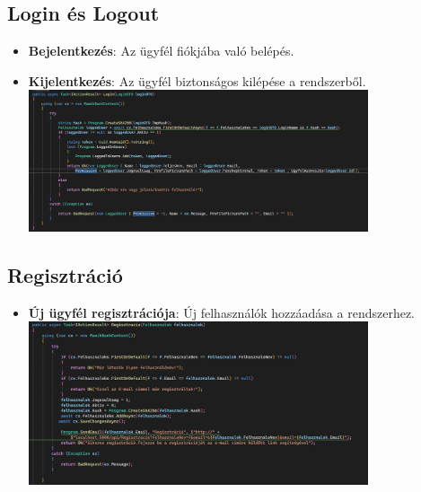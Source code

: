 \documentclass[colorlinks]{thesis-kando}
\theoremstyle{definition}
\theoremstyle{remark}
\begin{document}
\begin{itemize}
\subsection{Login és Logout}
\begin{itemize}
    \item \textbf{Bejelentkezés}: Az ügyfél fiókjába való belépés.
    \item \textbf{Kijelentkezés}: Az ügyfél biztonságos kilépése a rendszerből.
    \\
    \includegraphics[width=10cm]{figures/bejel_backend.png}
\end{itemize}

\subsection{Regisztráció}
\begin{itemize}
    \item \textbf{Új ügyfél regisztrációja}: Új felhasználók hozzáadása a rendszerhez.
    \\
    \includegraphics[width=10cm]{figures/reg_backend.png}

\end{itemize}


\end{itemize}
\end{document}
